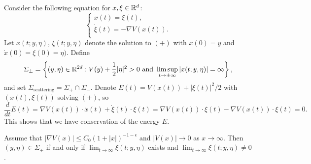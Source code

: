 \begin{remark}
  Consider the following equation for $x, \xi \in \mathbb{R}^d$:
  \[
    \begin{cases}
      \dot{x}(t) = \xi(t), \\
      \dot{\xi}(t) = -\nabla V(x(t)). \\
    \end{cases}
    \tag{$+$}
  \]
  Let $x(t; y, \eta)$, $\xi(t; y, \eta)$
  denote the solution to
  $(+)$ with $x(0) = y$ and $\dot{x}(0) = \xi(0) = \eta)$.
  Define
  \[
    \Sigma_{\pm} =
    \left\{
      (y, \eta) \in \mathbb{R}^{2d} :
      V(y) + \frac{1}{2} |\eta|^2 > 0 \text{ and }
      \limsup_{t \to \pm \infty} |x(t; y, \eta)| = \infty
    \right\},
  \]
  and set $\Sigma_{\mathrm{scattering}} = \Sigma_+ \cap \Sigma_-$.
  Denote $E(t) = V(x(t)) + |\xi(t)|^2 / 2$
  with $(x(t), \xi(t))$ solving $(+)$, so
  \[
    \frac{d}{dt} E(t)
    = \nabla V(x(t)) \cdot \dot{x}(t)
    + \dot{\xi}(t) \cdot \xi(t)
    = \nabla V(x(t)) \cdot \xi(t) - \nabla V(x(t)) \cdot \xi(t)
    = 0.
  \]
  This shows that we have conservation of the
  energy $E$.
\end{remark}

\begin{lemma}
  Assume that $|\nabla V(x)| \le C_0 (1 + |x|)^{-1 - \epsilon}$
  and $|V(x)| \to 0$ as $x \to \infty$. Then
  $(y, \eta) \in \Sigma_+$ if and only if
  $\lim_{t \to \infty} \xi(t; y, \eta)$ exists
  and $\lim_{t \to \infty} \xi(t; y, \eta) \ne 0$.
\end{lemma}

